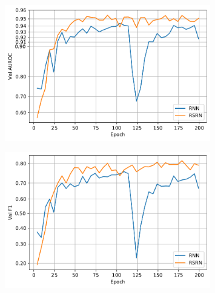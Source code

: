 \documentclass{article}
\begin{document}
\begin{figure}
    \centering
    \includegraphics[width=0.8\textwidth]{fig_auc}
\end{figure}

\begin{figure}
    \centering
    \includegraphics[width=0.8\textwidth]{fig_f1}
\end{figure}
\end{document}
